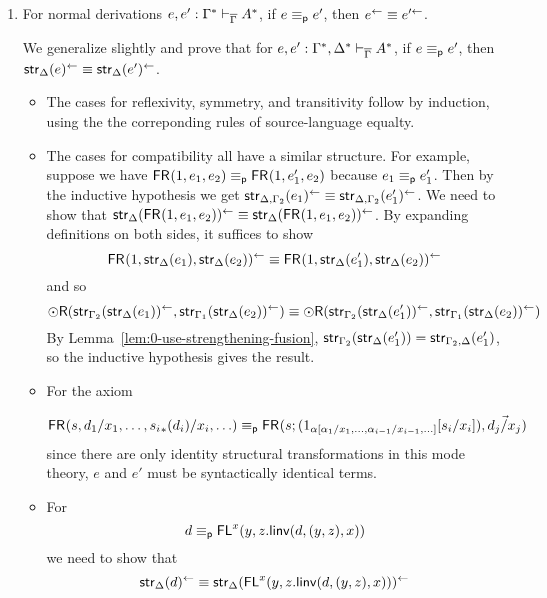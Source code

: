 \begin{enumerate}
\begin{itemize}
\end{itemize}

\item For normal derivations $e,e' :
  \Gamma^* \vdash_{\overline{\Gamma}} A^*$, if $e \equiv_{\mathsf{p}} e'$, then
  $e^{\leftarrow} \equiv e'^{\leftarrow}$.

We generalize slightly and prove that for 
$e,e' : \Gamma^*,\Delta^* \vdash_{\overline{\Gamma}} A^*$, 
if $e \equiv_{\mathsf{p}} e'$, then $\mathsf{str}_{\Delta}(e)^{\leftarrow} \equiv \mathsf{str}_{\Delta}(e')^{\leftarrow}$.

\begin{itemize}

\item The cases for reflexivity, symmetry, and transitivity follow by
  induction, using the the correponding rules of source-language
  equalty.

\item The cases for compatibility all have a similar structure.  For
  example, suppose we have $\mathsf{FR}_{}(1,e_1,e_2) \equiv_{\mathsf{p}}
  \mathsf{FR}_{}(1,e_1',e_2)$ because $e_1 \equiv_{\mathsf{p}} e_1'$.
  Then by the inductive
  hypothesis we get $\mathsf{str}_{\Delta,\Gamma_2}(e_1)^{\leftarrow} \equiv
  \mathsf{str}_{\Delta,\Gamma_2}(e_1')^{\leftarrow}$.
  We need to show that $\mathsf{str}_{\Delta}(\mathsf{FR}_{}(1,e_1,e_2))^{\leftarrow} \equiv 
  \mathsf{str}_{\Delta}(\mathsf{FR}_{}(1,e_1,e_2))^{\leftarrow}$.  By expanding definitions
  on both sides, it suffices to show
  \[
    \mathsf{FR}_{}(1,\mathsf{str}_{\Delta}(e_1),\mathsf{str}_{\Delta}(e_2))^{\leftarrow}
    \equiv 
    \mathsf{FR}_{}(1,\mathsf{str}_{\Delta}(e_1'),\mathsf{str}_{\Delta}(e_2))^{\leftarrow}
  \]
  and so
  \[
    \mathord{\odot}\mathsf{R}(\mathsf{str}_{\Gamma_2}(\mathsf{str}_{\Delta}(e_1))^{\leftarrow},\mathsf{str}_{\Gamma_1}(\mathsf{str}_{\Delta}(e_2))^{\leftarrow})
    \equiv 
    \mathord{\odot}\mathsf{R}(\mathsf{str}_{\Gamma_2}(\mathsf{str}_{\Delta}(e_1'))^{\leftarrow},\mathsf{str}_{\Gamma_1}(\mathsf{str}_{\Delta}(e_2))^{\leftarrow})
  \]
  By Lemma~\ref{lem:0-use-strengthening-fusion}, ${\mathsf{str}_{\Gamma_2}(\mathsf{str}_{\Delta}(e_1'))} =
  {\mathsf{str}_{\Gamma_2,\Delta}(e_1')}$, so the inductive hypothesis gives the
  result.

\item For the axiom

\[
\mathsf{FR}_{}(s,d_1/x_1,\ldots,{s_i}_*(d_i)/x_i,\ldots) \equiv_{\mathsf{p}} \mathsf{FR}_{}(s;(1_{\alpha[\alpha_1/x_1,\ldots,\alpha_{i-1}/x_{i-1},\ldots]}[s_i/x_i]),\vec{d_j/x_j})\\
\]
since there are only identity structural transformations in this mode
theory, $e$ and $e'$ must be syntactically identical terms.

\item For 
\[
d \equiv_{\mathsf{p}} \mathsf{FL}^{x}(y,z.\mathsf{linv}(d,(y,z),x))
\]
we need to show that
\[
\mathsf{str}_{\Delta}(d)^{\leftarrow}
\equiv 
\mathsf{str}_{\Delta}(\mathsf{FL}^{x}(y,z.\mathsf{linv}(d,(y,z),x)))^{\leftarrow}
\]


\end{itemize}
\end{enumerate}
